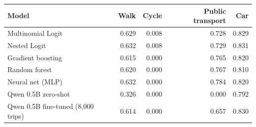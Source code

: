 \begin{tabular}{lrrrr}
\toprule
Model & Walk & Cycle & Public transport & Car \\
\midrule
Multinomial Logit & 0.629 & 0.008 & 0.728 & 0.829 \\
Nested Logit & 0.632 & 0.008 & 0.729 & 0.831 \\
Gradient boosting & 0.615 & 0.000 & 0.765 & 0.820 \\
Random forest & 0.620 & 0.000 & 0.767 & 0.810 \\
Neural net (MLP) & 0.632 & 0.000 & 0.784 & 0.820 \\
Qwen 0.5B zero-shot & 0.326 & 0.000 & 0.000 & 0.792 \\
Qwen 0.5B fine-tuned (8,000 trips) & 0.614 & 0.000 & 0.657 & 0.830 \\
\bottomrule
\end{tabular}
